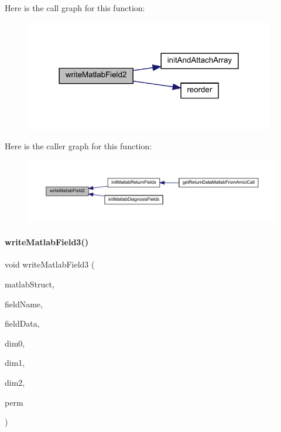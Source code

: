 Here is the call graph for this function\+:
\nopagebreak
\begin{figure}[H]
\begin{center}
\leavevmode
\includegraphics[width=309pt]{namespaceamici_a0a2748c0e1bf95de52a2e2cf3450584e_cgraph}
\end{center}
\end{figure}
Here is the caller graph for this function\+:
\nopagebreak
\begin{figure}[H]
\begin{center}
\leavevmode
\includegraphics[width=350pt]{namespaceamici_a0a2748c0e1bf95de52a2e2cf3450584e_icgraph}
\end{center}
\end{figure}
\mbox{\label{namespaceamici_ae2abb9d1f5b8350ced2799fc10f83ec7}} 
\paragraph{\texorpdfstring{write\+Matlab\+Field3()}{writeMatlabField3()}}
{\footnotesize\ttfamily void write\+Matlab\+Field3 (\begin{DoxyParamCaption}\item[{mx\+Array $\ast$}]{matlab\+Struct,  }\item[{const char $\ast$}]{field\+Name,  }\item[{std\+::vector$<$ T $>$}]{field\+Data,  }\item[{int}]{dim0,  }\item[{int}]{dim1,  }\item[{int}]{dim2,  }\item[{std\+::vector$<$ int $>$}]{perm }\end{DoxyParamCaption})}

